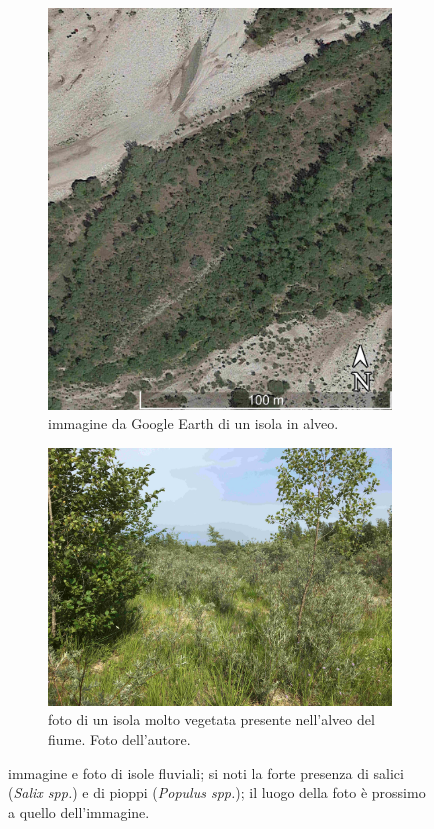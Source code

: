 \begin{figure}
	\centering
	\begin{subfigure}[b]{0.37\textwidth}
		\includegraphics[width=\textwidth]{files/esempio_isola_sat_1.jpg}
		\caption{immagine da Google Earth di un isola in alveo.}
		\label{fig:esempio-isola-sat-1}
	\end{subfigure}
	\quad
	\begin{subfigure}[b]{0.57\textwidth}
		\includegraphics[width=\textwidth]{files/esempio_isola_1.jpg}
		\caption{foto di un isola molto vegetata presente nell'alveo del fiume.
		Foto dell'autore.}
		\label{fig:esempio-isola-1}
	\end{subfigure}
	\caption[immagine e foto di isole fluviali]{immagine e foto di isole fluviali; si noti la forte presenza di salici (\emph{Salix spp.}) e di pioppi (\emph{Populus spp.}); il luogo della foto è prossimo a quello dell'immagine.}
\end{figure}

